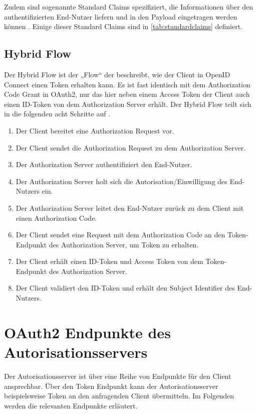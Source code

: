 Zudem sind sogenannte Standard Claims spezifiziert, die Informationen über den 
authentifizierten End-Nutzer liefern und in den Payload eingetragen werden können \citep{openidconnect:2014}.  
Einige dieser Standard Claims sind in \autoref{tab:standardclaims} definiert. 

\subsection{Hybrid Flow}
\label{subsec:OpenIDConnect:HybridFlow}
Der Hybrid Flow ist der „Flow“ der beschreibt, wie der Client in OpenID Connect einen
Token erhalten kann. Es ist fast identisch mit dem Authorization Code Grant in OAuth2, nur 
das hier neben einem Access Token der Client auch einen ID-Token von dem Authorization 
Server erhält. Der Hybrid Flow teilt sich in die folgenden acht Schritte auf \citep{openidconnect:2014}.

\begin{enumerate}
  \item Der Client bereitet eine Authorization Request vor.
  \item Der Client sendet die Authorization Request zu dem Authorization Server.
  \item Der Authorization Server authentifiziert den End-Nutzer. 
  \item Der Authorization Server holt sich die Autorisation/Einwilligung des End-Nutzers ein. 
  \item Der Authorization Server leitet den End-Nutzer zurück zu dem Client mit 
  einen Authorization Code.
  \item Der Client sendet eine Request mit dem Authorization Code an den Token-Endpunkt des Authorization Server, um Token zu erhalten. 
  \item Der Client erhält einen ID-Token und Access Token von dem Token-Endpunkt des Authorization Server.
  \item Der Client validiert den ID-Token und erhält den Subject Identifier des End-Nutzers.    
\end{enumerate}

\section{OAuth2 Endpunkte des Autorisationsservers}
\label{sec:OAuth2EndpunktedesAutorisationsservers}

Der Autorisationsserver ist über eine Reihe von Endpunkte für den Client ansprechbar. Über den Token 
Endpunkt kann der Autorisationsserver beispielsweise Token an den anfragenden Client 
übermitteln. Im Folgenden werden die relevanten Endpunkte erläutert.

